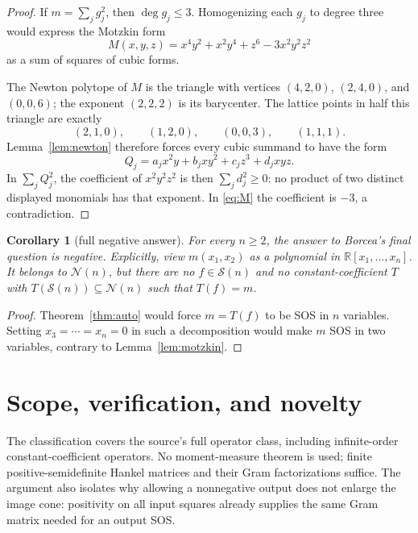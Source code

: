 \documentclass[11pt]{article}
\newtheorem{corollary}[theorem]{Corollary}
\theoremstyle{remark}
\newcommand{\R}{\mathbb R}
\newcommand{\SOS}{\mathcal S}
\newcommand{\POS}{\mathcal N}
\begin{document}
\begin{proof}
If $m=\sum_jg_j^2$, then $\deg g_j\leq3$.  Homogenizing each $g_j$ to
degree three would express the Motzkin form
\begin{equation}\label{eq:M}
 M(x,y,z)=x^4y^2+x^2y^4+z^6-3x^2y^2z^2
\end{equation}
as a sum of squares of cubic forms.

The Newton polytope of $M$ is the triangle with vertices
$(4,2,0)$, $(2,4,0)$, and $(0,0,6)$; the exponent $(2,2,2)$ is its
barycenter.  The lattice points in half this triangle are exactly
\[
 (2,1,0),\qquad(1,2,0),\qquad(0,0,3),\qquad(1,1,1).
\]
Lemma~\ref{lem:newton} therefore forces every cubic summand to have the form
\[
 Q_j=a_jx^2y+b_jxy^2+c_jz^3+d_jxyz.
\]
In $\sum_jQ_j^2$, the coefficient of $x^2y^2z^2$ is then
$\sum_jd_j^2\geq0$: no product of two distinct displayed monomials has that
exponent.  In \eqref{eq:M} the coefficient is $-3$, a contradiction.
\end{proof}

\begin{corollary}[full negative answer]\label{cor:negative}
For every $n\geq2$, the answer to Borcea's final question is negative.
Explicitly, view $m(x_1,x_2)$ as a polynomial in
$\R[x_1,\ldots,x_n]$.  It belongs to $\POS(n)$, but there are no
$f\in\SOS(n)$ and no constant-coefficient $T$ with
$T(\SOS(n))\subseteq\POS(n)$ such that $T(f)=m$.
\end{corollary}

\begin{proof}
Theorem~\ref{thm:auto} would force $m=T(f)$ to be SOS in $n$ variables.
Setting $x_3=\cdots=x_n=0$ in such a decomposition would make $m$ SOS in
two variables, contrary to Lemma~\ref{lem:motzkin}.
\end{proof}

\section{Scope, verification, and novelty}

The classification covers the source's full operator class, including
infinite-order constant-coefficient operators.  No moment-measure theorem is
used; finite positive-semidefinite Hankel matrices and their Gram
factorizations suffice.  The argument also isolates why allowing a
nonnegative output does not enlarge the image cone: positivity on all input
squares already supplies the same Gram matrix needed for an output SOS.
\end{document}
